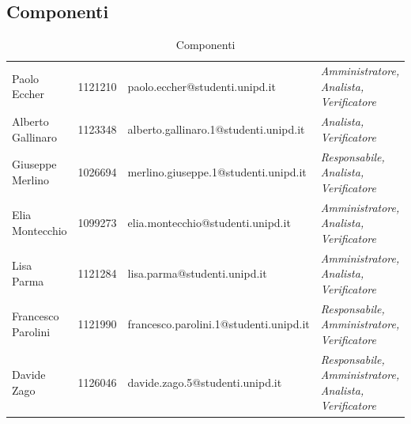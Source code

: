 	\subsection{Componenti}	
	\begin{table}[H]
		\centering
		\begin{tabular}{|C{2cm}|C{2.3cm}|C{7cm}|C{3cm}|}
			\hline
			 &  & & \\
			\hline			
			Paolo Eccher & 1121210 & paolo.eccher@studenti.unipd.it &  \textit{Amministratore, Analista, Verificatore} \\
			\hline
			Alberto Gallinaro & 1123348 & alberto.gallinaro.1@studenti.unipd.it  &  \textit{Analista, Verificatore} \\
			\hline
			Giuseppe Merlino & 1026694 & merlino.giuseppe.1@studenti.unipd.it & \textit{Responsabile, Analista, Verificatore} \\
			\hline
			Elia Montecchio & 1099273 & elia.montecchio@studenti.unipd.it & \textit{Amministratore, Analista, Verificatore} \\
			\hline
			Lisa Parma & 1121284 & lisa.parma@studenti.unipd.it & \textit{Amministratore, Analista, Verificatore} \\
			\hline
			Francesco Parolini & 1121990 & francesco.parolini.1@studenti.unipd.it  & \textit{Responsabile, Amministratore, Verificatore} \\
			\hline
			Davide Zago & 1126046 & davide.zago.5@studenti.unipd.it & \textit{Responsabile, Amministratore, Analista, Verificatore }\\
			\hline
		\end{tabular}
		\caption{Componenti}
	\end{table}
	
	